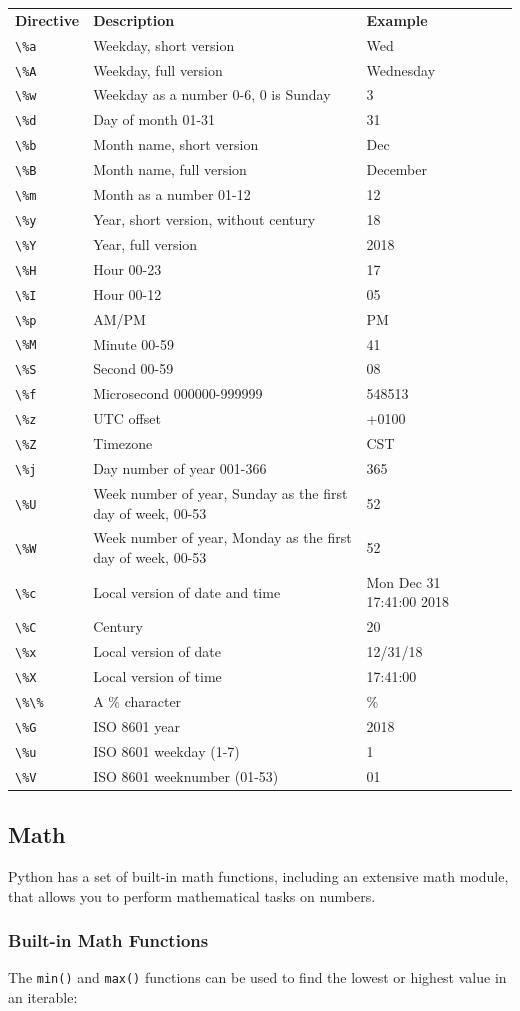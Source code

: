 \documentclass[12pt,a4paper]{article}
\newcommand{\code}[1]{%
	\colorbox{backcolour}{\lstinline{#1}}%
}
\newcommand{\lcode}[1]{%
	\lstinline{#1}%
}
\newcommand{\trcol}[3]{%
	#1 \quad  & #2 & #3 \\
}
\begin{document}
\begin{table}[h]
	\begin{center}
		\begin{tabularx}{\textwidth}{lXll}
\trcol{\textbf{Directive}}{\textbf{Description}}{\textbf{Example}}
\trcol{\lcode{\%a}}{Weekday, short version}{Wed}
\trcol{\lcode{\%A}}{Weekday, full version}{Wednesday}
\trcol{\lcode{\%w}}{Weekday as a number 0-6, 0 is Sunday}{3}
\trcol{\lcode{\%d}}{Day of month 01-31}{31}
\trcol{\lcode{\%b}}{Month name, short version}{Dec}
\trcol{\lcode{\%B}}{Month name, full version}{December}
\trcol{\lcode{\%m}}{Month as a number 01-12}{12}
\trcol{\lcode{\%y}}{Year, short version, without century}{18}
\trcol{\lcode{\%Y}}{Year, full version}{2018}
\trcol{\lcode{\%H}}{Hour 00-23}{17}
\trcol{\lcode{\%I}}{Hour 00-12}{05}
\trcol{\lcode{\%p}}{AM/PM}{PM}
\trcol{\lcode{\%M}}{Minute 00-59}{41}
\trcol{\lcode{\%S}}{Second 00-59}{08}
\trcol{\lcode{\%f}}{Microsecond 000000-999999}{548513}
\trcol{\lcode{\%z}}{UTC offset}{+0100}
\trcol{\lcode{\%Z}}{Timezone}{CST}
\trcol{\lcode{\%j}}{Day number of year 001-366}{365}
\trcol{\lcode{\%U}}{Week number of year, Sunday as the first day of week, 00-53}{52}
\trcol{\lcode{\%W}}{Week number of year, Monday as the first day of week, 00-53}{52}
\trcol{\lcode{\%c}}{Local version of date and time}{Mon Dec 31 17:41:00 2018}
\trcol{\lcode{\%C}}{Century}{20}
\trcol{\lcode{\%x}}{Local version of date}{12/31/18}
\trcol{\lcode{\%X}}{Local version of time}{17:41:00}
\trcol{\lcode{\%\%}}{A \% character}{\%}
\trcol{\lcode{\%G}}{ISO 8601 year}{2018}
\trcol{\lcode{\%u}}{ISO 8601 weekday (1-7)}{1}
\trcol{\lcode{\%V}}{ISO 8601 weeknumber (01-53)}{01}
		\end{tabularx}
	\end{center}
\end{table}
\subsection{Math}

Python has a set of built-in math functions, including an extensive math
module, that allows you to perform mathematical tasks on numbers.

\subsubsection{Built-in Math Functions}

The \code{min()} and \code{max()} functions can be used to find the lowest
or highest value in an iterable:
\end{document}
